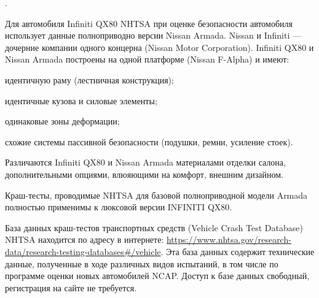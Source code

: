 %
%
%
%
%
%	
%	
	
.

Для автомобиля Infiniti QX80 NHTSA при оценке безопасности автомобиля использует данные полноприводно версии Nissan Armada.  Nissan и Infiniti — дочерние компании одного концерна (Nissan Motor Corporation).     Infiniti QX80 и Nissan Armada построены на одной платформе (Nissan F-Alpha) и имеют: 

идентичную раму (лестничная конструкция);

идентичные кузова и силовые элементы;

одинаковые зоны деформации;

схожие системы пассивной безопасности (подушки, ремни, усиление стоек).


Различаются Infiniti QX80 и Nissan Armada  материалами отделки салона, дополнительными опциями, влюяющими на комфорт, внешним дизайном.

Краш-тесты, проводимые NHTSA для базовой полноприводной модели Armada  полностью применимы к люксовой версии INFINITI QX80.

	База 	данных 	краш-тестов 	транспортных средств (Vehicle Crash Test Database) NHTSA находится  по адресу в интернете: \url{ https://www.nhtsa.gov/research-data/research-testing-databases#/vehicle}. Эта база данных  содержит технические 	данные, полученные в ходе различных видов испытаний, в том числе 	по программе оценки новых автомобилей NCAP. Доступ к базе данных 	свободный, регистрация на сайте не требуется. 
%

